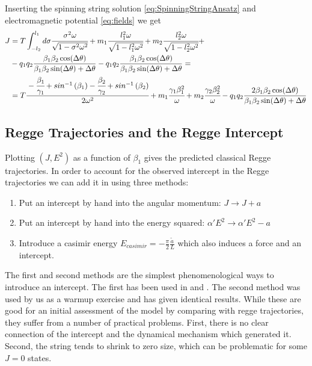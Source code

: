 \documentclass[11pt,a4paper]{article}
\begin{document}
Inserting the spinning string solution \ref{eq:SpinningStringAnsatz} and electromagnetic potential \ref{eq:fields} we get
\begin{align}
J&=T\int_{-l_{2}}^{l_{1}}d\sigma\cfrac{\sigma^{2}\omega}{\sqrt{1-\sigma^{2}\omega^{2}}}+m_1\cfrac{l_{1}^{2}\omega}{\sqrt{1-l_{1}^{2}\omega^{2}}}+m_2\cfrac{l_{2}^{2}\omega}{\sqrt{1-l_{2}^{2}\omega^{2}}}+\notag \\
&-q_{1}q_{2}\frac{\beta_{1}\beta_{2}\cos(\Delta\theta)}{\beta_{1}\beta_{2}\sin(\Delta\theta)+\Delta\theta}-q_{1}q_{2}\frac{\beta_{1}\beta_{2}\cos(\Delta\theta)}{\beta_{1}\beta_{2}\sin(\Delta\theta)+\Delta\theta}=\notag\\
&=T\cfrac{-\cfrac{\beta_{1}}{\gamma_{1}}+sin^{-1}\left(\beta_{1}\right)-\cfrac{\beta_{2}}{\gamma_{2}}+sin^{-1}\left(\beta_{2}\right)}{2\omega^{2}}+m_1\cfrac{\gamma_{1}\beta_{1}^{2}}{\omega}+m_2\cfrac{\gamma_{2}\beta_{2}^{2}}{\omega}-q_{1}q_{2}\frac{2\beta_{1}\beta_{2}\cos(\Delta\theta)}{\beta_{1}\beta_{2}\sin(\Delta\theta)+\Delta\theta}
\end{align} 
\FloatBarrier
 \subsection{Regge Trajectories and the Regge Intercept}
 \label{sec:regge}
 
Plotting $\left(J,E^{2}\right)$ as a function of $\beta_{1}$ gives the predicted classical Regge trajectories. In order to account for the observed intercept in the Regge trajectories we can add it in using three methods:
\begin{enumerate}
\item Put an intercept by hand into the angular momentum: $J\rightarrow J+a$
\item Put an intercept by hand into the energy squared: $\alpha'E^{2}\rightarrow\alpha'E^{2}-a$
\item Introduce a casimir energy $E_{casimir}=-\frac{\pi}{2}\frac{\tilde{a}}{L}$ which also induces a force and an intercept.
\end{enumerate}

The first and second methods are the simplest phenomenological ways to introduce an intercept. The first has been used in \cite{Sonnenschein14} and \cite{Sonnenschein15}. The second method was used by us as a warmup exercise and has given identical results. While these are good for an initial assessment of the model by comparing with regge trajectories, they suffer from a number of practical problems. First, there is no clear connection of the intercept and the dynamical mechanism which generated it. Second, the string tends to shrink to zero size, which can be problematic for some $J=0$ states.
\end{document}

